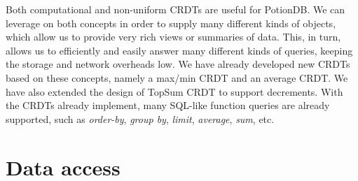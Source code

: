 Both computational and non-uniform CRDTs are useful for PotionDB.
We can leverage on both concepts in order to supply many different kinds of objects, which allow us to provide very rich views or summaries of data. 
This, in turn, allows us to efficiently and easily answer many different kinds of queries, keeping the storage and network overheads low.
We have already developed new CRDTs based on these concepts, namely a max/min CRDT and an average CRDT.
We have also extended the design of TopSum CRDT to support decrements.
With the CRDTs already implement, many SQL-like function queries are already supported, such as \emph{order-by}, \emph{group by}, \emph{limit}, \emph{average}, \emph{sum}, etc.











\section{Data access}
\label{sec:data_access}

